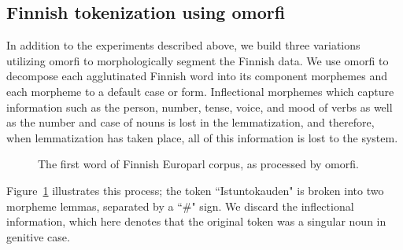 

\subsection{Finnish tokenization using omorfi}
\label{sec:fien2}

In addition to the experiments described above, we build three variations utilizing omorfi \cite{omorfi} to morphologically segment the Finnish data.
%  
We use omorfi to decompose each agglutinated Finnish word into its component morphemes and each morpheme to a default case or form.
%
Inflectional morphemes which capture information such as the person, number, tense, voice, and mood of verbs as well as the number and case of nouns is lost in the lemmatization, and therefore, when lemmatization has taken place, all of this information is lost to the system.
%
%
\begin{figure}[!t]
{}\newline
{}\newline
\caption{The first word of Finnish Europarl corpus, as processed by omorfi.}
\label{fig:omorfi}
\end{figure}
%
Figure~\ref{fig:omorfi} illustrates this process;
%
the token ``Istuntokauden" is broken into two morpheme lemmas, separated by a ``\#" sign.
%
We discard the inflectional information, which here denotes that the original token was a singular noun in genitive case.
%
%
%
%


